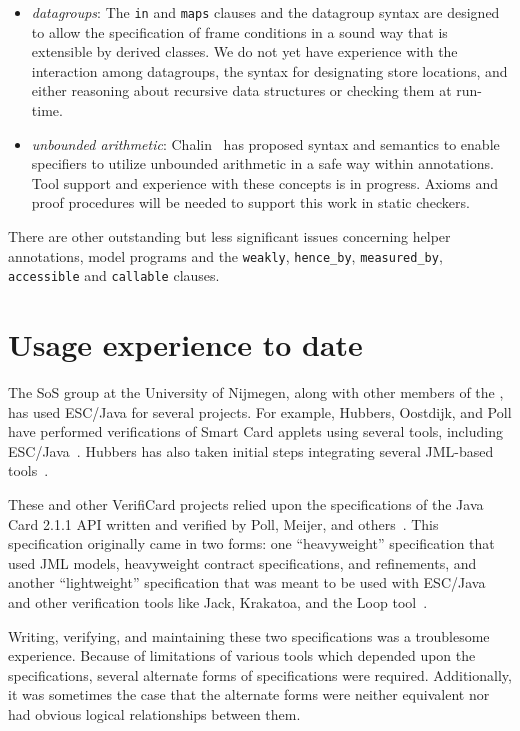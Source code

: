 \documentclass{llncs}
\begin{document}
\begin{itemize}
\item \textit{datagroups}: The \texttt{in} and \texttt{maps} clauses
  and the datagroup syntax are designed to allow the specification of
  frame conditions in a sound way that is extensible by derived
  classes.  We do not yet have experience with the interaction among
  datagroups, the syntax for designating store locations, and either
  reasoning about recursive data structures or checking them at
  run-time.
\item \textit{unbounded arithmetic}: Chalin~\cite{Chalin03} has
  proposed syntax and semantics to enable specifiers to utilize
  unbounded arithmetic in a safe way within annotations.  Tool support
  and experience with these concepts is in progress.  Axioms and proof
  procedures will be needed to support this work in static checkers.
\end{itemize}
There are other outstanding but less significant issues concerning
helper annotations, model programs and the \texttt{weakly},
\texttt{hence\_by}, \texttt{measured\_by}, \texttt{accessible} and
\texttt{callable} clauses.

\section{Usage experience to date}
\label{sec:usage-exper-date}
The SoS group at the University of Nijmegen, along with other members
of the , has used ESC/Java for several
projects.  For example, Hubbers, Oostdijk, and Poll have performed
verifications of Smart Card applets using several tools, including
ESC/Java~\cite{HOP04}.  Hubbers has also taken initial steps
integrating several JML-based tools~\cite{Hub03}.

These and other VerifiCard projects relied upon the specifications of
the Java Card 2.1.1 API written and verified by Poll, Meijer, and
others~\cite{MeijerPoll01}.  This specification originally came in two
forms: one ``heavyweight'' specification that used JML models,
heavyweight contract specifications, and refinements, and another
``lightweight'' specification that was meant to be used with ESC/Java
and other verification tools like Jack, Krakatoa, and the Loop
tool~\cite{BergJ01,BurdyRequet02,MarchePaulinMohringUrbain04}.

Writing, verifying, and maintaining these two specifications was a
troublesome experience.  Because of limitations of various tools which
depended upon the specifications, several alternate forms of
specifications were required.  Additionally, it was sometimes the case
that the alternate forms were neither equivalent nor had obvious
logical relationships between them.
\end{document}

